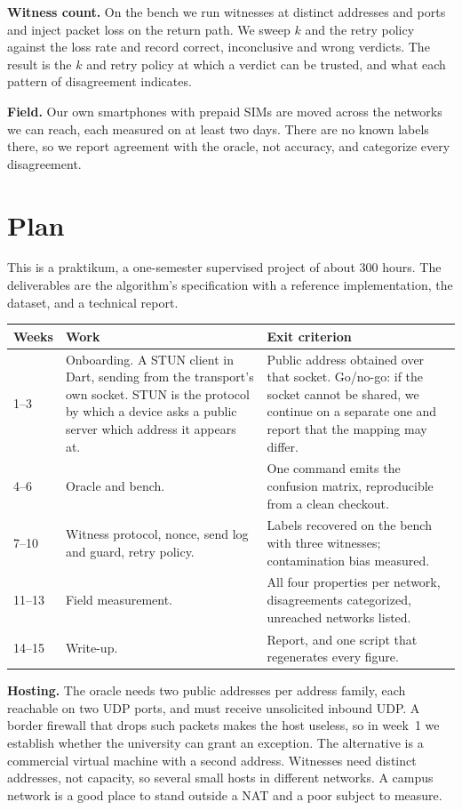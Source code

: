\documentclass[11pt]{article}
\begin{document}
\textbf{Witness count.} On the bench we run witnesses at distinct addresses and ports and inject packet loss on the return path. We sweep $k$ and the retry policy against the loss rate and record correct, inconclusive and wrong verdicts. The result is the $k$ and retry policy at which a verdict can be trusted, and what each pattern of disagreement indicates.

\textbf{Field.} Our own smartphones with prepaid SIMs are moved across the networks we can reach, each measured on at least two days. There are no known labels there, so we report agreement with the oracle, not accuracy, and categorize every disagreement.

\section{Plan}

This is a praktikum, a one-semester supervised project of about 300 hours. The deliverables are the algorithm's specification with a reference implementation, the dataset, and a technical report.

{\footnotesize
\begin{longtable}{L{1.4cm} L{6.0cm} L{7.4cm}}
\toprule
\textbf{Weeks} & \textbf{Work} & \textbf{Exit criterion} \\
\midrule
{}--3 & Onboarding. A STUN client in Dart, sending from the transport's own socket. STUN is the protocol by which a device asks a public server which address it appears at. & Public address obtained over that socket. Go/no-go: if the socket cannot be shared, we continue on a separate one and report that the mapping may differ. \\
4--6 & Oracle and bench. & One command emits the confusion matrix, reproducible from a clean checkout. \\
7--10 & Witness protocol, nonce, send log and guard, retry policy. & Labels recovered on the bench with three witnesses; contamination bias measured. \\
11--13 & Field measurement. & All four properties per network, disagreements categorized, unreached networks listed. \\
14--15 & Write-up. & Report, and one script that regenerates every figure. \\
\bottomrule
\end{longtable}
}

\textbf{Hosting.} The oracle needs two public addresses per address family, each reachable on two UDP ports, and must receive unsolicited inbound UDP. A border firewall that drops such packets makes the host useless, so in week~1 we establish whether the university can grant an exception. The alternative is a commercial virtual machine with a second address. Witnesses need distinct addresses, not capacity, so several small hosts in different networks. A campus network is a good place to stand outside a NAT and a poor subject to measure.
\end{document}
